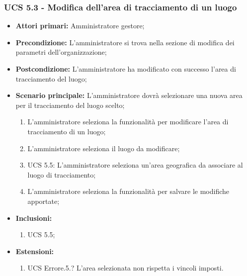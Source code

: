 \subsubsection{UCS 5.3 - Modifica dell'area di tracciamento di un luogo}%
\begin{itemize}
    \item \textbf{Attori primari:} Amministratore gestore;
    \item \textbf{Precondizione:} L'amministratore si trova nella sezione di modifica dei parametri dell'organizzazione;
    \item \textbf{Postcondizione:} L'amministratore ha modificato con successo l'area di tracciamento del luogo;
    \item \textbf{Scenario principale:} L'amministratore dovrà selezionare una nuova area per il tracciamento del luogo scelto;
    \begin{enumerate}%
        \item L'amministratore seleziona la funzionalità per modificare l'area di tracciamento di un luogo;
        \item L'amministratore seleziona il luogo da modificare;
        \item UCS 5.5: L'amministratore seleziona un'area geografica da associare al luogo di tracciamento;
        \item L'amministratore seleziona la funzionalità per salvare le modifiche apportate;
    \end{enumerate}
    \item \textbf{Inclusioni:}
    \begin{enumerate}
        \item UCS 5.5;
    \end{enumerate}
    \item \textbf{Estensioni:}
    \begin{enumerate}
        \item UCS Errore.5.? L'area selezionata non rispetta i vincoli imposti.
    \end{enumerate}
\end{itemize}

